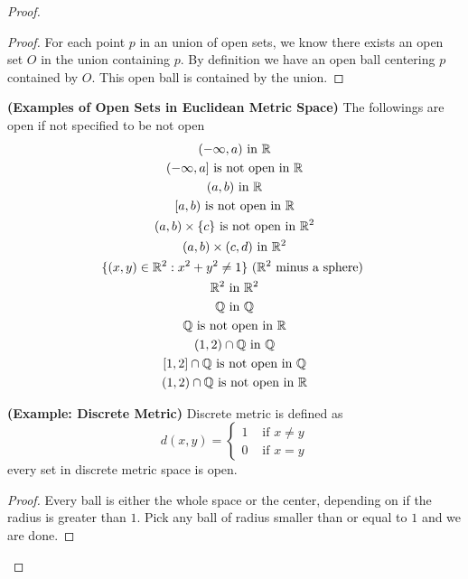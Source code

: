 \documentclass{report}
\begin{document}
\begin{proof}
\begin{proof}
For each point $p$ in an union of open sets, we know there exists an open set $O$ in the union containing $p$. By definition we have an open ball centering  $p$ contained by  $O$. This open ball is contained by the union.
\end{proof}
\begin{theorem}
\label{1.5.7}
\textbf{(Examples of Open Sets in Euclidean Metric Space)} The followings are open if not specified to be not open
\begin{gather}
   (-\infty , a)\text{ in }\R\\
   (-\infty,a]\text{ is not open in }\R\\
   (a,b)\text{ in }\R\\
   [a,b)\text{ is not open in }\R\\
   (a,b)\times \set{c}\text{ is not open in  }\R^2\\
   (a,b)\times (c,d)\text{ in }\R^2\\
   \set{(x,y)\inr^2: x^2+y^2\neq 1}\text{ ($\R^2$ minus a sphere) }\\
      \R^2 \text{ in } \R^2\\ 
      \Q\text{ in }\Q\\
      \Q\text{ is not open in }\R\\
      (1,2)\cap \Q\text{ in }\Q\\
      [1,2]\cap \Q\text{ is not open in }\Q\\
      (1,2)\cap \Q\text{ is not open in }\R
\end{gather}
\end{theorem}
\begin{theorem}
\label{1.5.8}
\textbf{(Example: Discrete Metric)} Discrete metric is defined as
\begin{equation}
d(x,y)=\begin{cases}
  1& \text{ if  }x\neq y\\
  0& \text{ if  }x=y
\end{cases}
\end{equation}
every set in discrete metric space is open.
\end{theorem}
\begin{proof}
Every ball is either the whole space or the center, depending on if the radius is greater than $1$. Pick any ball of radius smaller than or equal to  $1$ and we are done.

\end{proof}
\end{proof}
\end{document}
